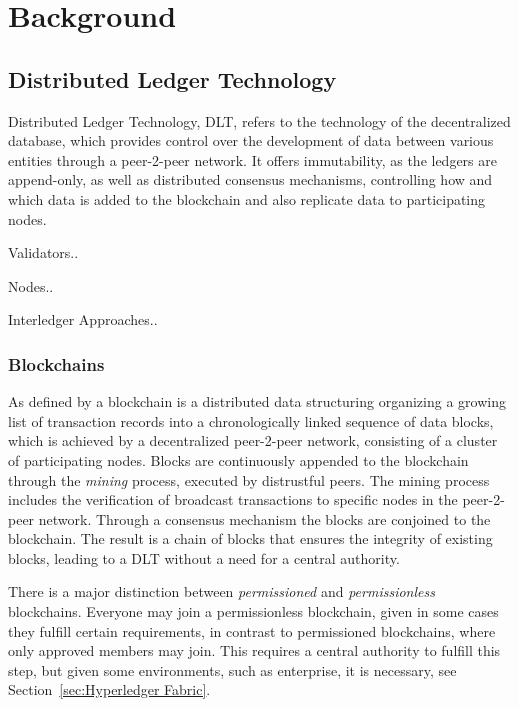 \chapter{Background}
\label{chap:Background}


\section{Distributed Ledger Technology} %
\label{sec:Distributed Ledger Technology}

Distributed Ledger Technology, DLT, refers to the technology of the decentralized database, which provides control over
the development of data between various entities through a peer-2-peer network. It offers immutability, as the ledgers
are append-only, as well as distributed consensus mechanisms, controlling how and which data is added to the blockchain
and also replicate data to participating nodes. \cite{skarmeta-interledger-management-2020}

Validators..

Nodes..

Interledger Approaches..

\subsection{Blockchains} %
\label{sub:Blockchains}
As defined by \cite{diam-iot-2020} a blockchain is a distributed data structuring organizing a growing list of
transaction records into a chronologically linked sequence of data blocks, which is achieved by a decentralized
peer-2-peer network, consisting of a cluster of participating nodes. Blocks are continuously appended to the blockchain
through the \textit{mining} process, executed by distrustful peers. The mining process includes the verification of
broadcast transactions to specific nodes in the peer-2-peer network. Through a consensus mechanism the blocks are
conjoined to the blockchain. The result is a chain of blocks that ensures the integrity of existing blocks, leading to a
DLT without a need for a central authority.

There is a major distinction between \textit{permissioned} and \textit{permissionless} blockchains.
Everyone may join a permissionless blockchain, given in some cases they fulfill certain requirements, in contrast to
permissioned blockchains, where only approved members may join. \cite{hyperledger:aries-rfc} This requires a central
authority to fulfill this step, but given some environments, such as enterprise, it is necessary, see
Section~\ref{sec:Hyperledger Fabric}.

